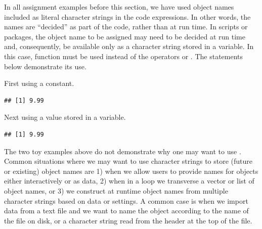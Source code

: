 \documentclass[krantz2]{krantz}\usepackage{knitr}
\begin{document}
In all assignment examples before this section, we have used object names included as literal character strings in the code expressions. In other words, the names are ``decided'' as part of the code, rather than at run time. In scripts or packages, the object name to be assigned may need to be decided at run time and, consequently, be available only as a character string stored in a variable. In this case, function  must be used instead of the operators \code{<-} or \code{->}. The statements below demonstrate its use.

First using a  constant.

\begin{knitrout}\footnotesize
{}\color{fgcolor}\begin{kframe}
\begin{alltt}
\hlstd{(}\hlstd{,} \hlstd{)}
\end{alltt}
\begin{verbatim}
## [1] 9.99
\end{verbatim}
\end{kframe}
\end{knitrout}
Next using a  value stored in a variable.

\begin{knitrout}\footnotesize
{}\color{fgcolor}\begin{kframe}
\begin{alltt}
 \hlkwb{<-} 
 \hlstd{)}
\end{alltt}
\begin{verbatim}
## [1] 9.99
\end{verbatim}
\end{kframe}
\end{knitrout}

The two toy examples above do not demonstrate why one may want to use . Common situations where we may want to use character strings to store (future or existing) object names are 1) when we allow users to provide names for objects either interactively or as  data, 2) when in a loop we transverse a vector or list of object names, or 3) we construct at runtime object names from multiple character strings based on data or settings. A common case is when we import data from a text file and we want to name the object according to the name of the file on disk, or a character string read from the header at the top of the file.
\end{document}

